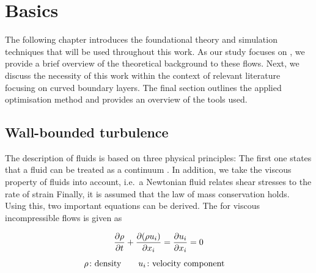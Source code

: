 
\chapter{Basics}
\label{chap:basics}
The following chapter introduces the foundational theory and simulation techniques that will be used throughout this work. As our study focuses on , we provide a brief overview of the theoretical background to these flows. Next, we discuss the necessity of this work within the context of relevant literature focusing on curved boundary layers. The final section outlines the applied optimisation method and provides an overview of the tools used. 


\section{Wall-bounded turbulence}\label{sec:turbulenceTheory}


The description of fluids is based on three physical principles:
The first one  states that a fluid can be treated as a continuum \citep{batchelor_introduction_2000}.
In addition, we take the viscous property of fluids into account, i.e.~a Newtonian fluid relates shear stresses to the rate of strain \citep{tennekes_first_1972}
Finally, it is assumed that the law of mass conservation  holds.
Using this, two important equations can be derived.
The  for viscous incompressible flows is given 
as


\begin{gather}
    \frac{\partial \rho}{\partial t} + \frac{\partial (\rho u_i)}{\partial x_i} = \frac{\partial u_i}{\partial x_i} = 0  \\[4pt]
    \begin{aligned}
        \rho &\colon \text{density} & \quad u_i &\colon \text{velocity component}
    \end{aligned} \notag
\end{gather}

